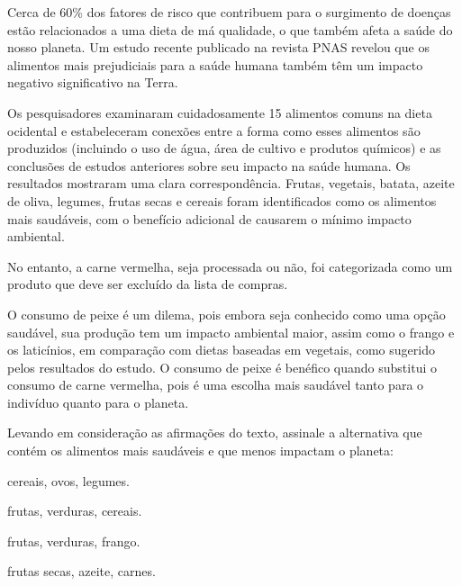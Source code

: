 \begin{myquote}
Cerca de 60\% dos fatores de risco que contribuem para o surgimento de doenças
estão relacionados a uma dieta de má qualidade, o que também afeta a saúde do
nosso planeta. Um estudo recente publicado na revista PNAS revelou que os
alimentos mais prejudiciais para a saúde humana também têm um impacto negativo
significativo na Terra.

Os pesquisadores examinaram cuidadosamente 15 alimentos comuns na dieta
ocidental e estabeleceram conexões entre a forma como esses alimentos são
produzidos (incluindo o uso de água, área de cultivo e produtos químicos) e as
conclusões de estudos anteriores sobre seu impacto na saúde humana. Os
resultados mostraram uma clara correspondência. Frutas, vegetais, batata,
azeite de oliva, legumes, frutas secas e cereais foram identificados como os
alimentos mais saudáveis, com o benefício adicional de causarem o mínimo
impacto ambiental.

No entanto, a carne vermelha, seja processada ou não, foi categorizada como um
produto que deve ser excluído da lista de compras.

O consumo de peixe é um dilema, pois embora seja conhecido como uma opção
saudável, sua produção tem um impacto ambiental maior, assim como o frango e
os laticínios, em comparação com dietas baseadas em vegetais, como sugerido
pelos resultados do estudo. O consumo de
peixe é benéfico quando substitui o consumo de carne vermelha, pois é uma
escolha mais saudável tanto para o indivíduo quanto para o planeta.


\end{myquote}

Levando em consideração as afirmações do texto, assinale a alternativa que contém os alimentos
mais saudáveis e que menos impactam o planeta:

\begin{escolha}
  
    \item cereais, ovos, legumes.
  
    \item frutas, verduras, cereais.
  
    \item frutas, verduras, frango.
  
    \item frutas secas, azeite, carnes.

\end{escolha}

